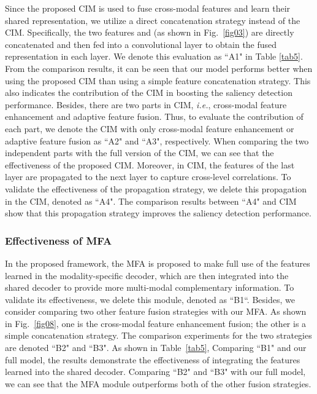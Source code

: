 \documentclass[10pt,twocolumn,letterpaper]{article}
\def\ie{\emph{i.e.}}
\begin{document}
Since the proposed CIM is used to fuse cross-modal features and learn their shared representation, we utilize a direct concatenation strategy instead of the CIM. Specifically, the two features  and  (as shown in Fig.~\ref{fig03}) are directly concatenated and then fed into a  convolutional layer to obtain the fused representation in each layer. We denote this evaluation as ``A1" in Table \ref{tab5}. From the comparison results, it can be seen that our model performs better when using the proposed CIM than using a simple feature concatenation strategy. This also indicates the contribution of the CIM in boosting the saliency detection performance. Besides, there are two parts in CIM, \ie, cross-modal feature enhancement and adaptive feature fusion. Thus, to evaluate the contribution of each part, we denote the CIM with only cross-modal feature enhancement or adaptive feature fusion as ``A2" and ``A3", respectively. When comparing the two independent parts with the full version of the CIM, we can see that the effectiveness of the proposed CIM. Moreover, in CIM, the features of the last layer are propagated to the next layer to capture cross-level correlations. To validate the effectiveness of the propagation strategy, we delete this propagation in the CIM, denoted as ``A4". The comparison results between ``A4" and CIM show that this propagation strategy improves the saliency detection performance.



\subsubsection{Effectiveness of MFA}
\label{shared_ablation}

In the proposed framework, the MFA is proposed to make full use of the features learned in the modality-specific decoder, which are then integrated into the shared decoder to provide more multi-modal complementary information. To validate its effectiveness, we delete this module, denoted as ``B1“. Besides, we consider comparing two other feature fusion strategies with our MFA. As shown in Fig.~\ref{fig08}, one is the cross-modal feature enhancement fusion; the other is a simple concatenation strategy. The comparison experiments for the two strategies are denoted ``B2" and ``B3". As shown in Table~\ref{tab5}, Comparing ``B1" and our full model, the results demonstrate the effectiveness of integrating the features learned into the shared decoder. Comparing ``B2" and ``B3" with our full model, we can see that the MFA module outperforms both of the other fusion strategies.
\end{document}
